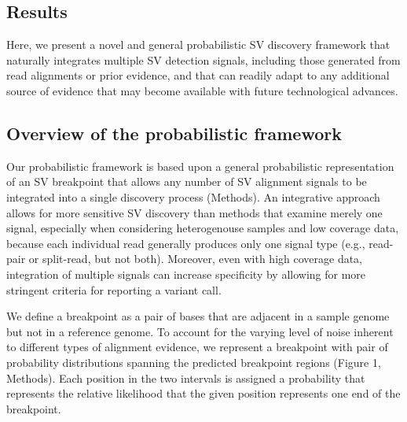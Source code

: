 \documentclass[10pt]{bmc_article}
\newenvironment{bmcformat}{\begin{raggedright}\baselineskip20pt\sloppy\setboolean{publ}{false}}{\end{raggedright}\baselineskip20pt\sloppy}
\begin{document}
\begin{bmcformat}
\section*{Results}
Here, we present a novel and general probabilistic SV discovery framework that
naturally integrates multiple SV detection signals, including those generated
from read alignments or prior evidence, and that can readily adapt to any
additional source of evidence that may become available with future
technological advances.

\subsection*{Overview of the probabilistic framework}

Our probabilistic framework is based upon a general probabilistic representation
of an SV breakpoint that allows any number of SV alignment signals to be
integrated into a single discovery process (Methods). An integrative approach
allows for more sensitive SV discovery than methods that examine merely one
signal, especially when considering heterogenouse samples and low coverage data,
because each individual read generally produces only one signal type (e.g.,
read-pair or split-read, but not both). Moreover, even with high coverage data,
integration of multiple signals can increase specificity by allowing for more
stringent criteria for reporting a variant call.

We define a breakpoint as a pair of bases that are adjacent in a sample genome
but not in a reference genome. To account for the varying level of noise
inherent to different types of alignment evidence, we represent a breakpoint
with pair of probability distributions spanning the predicted breakpoint regions
(Figure 1, Methods). Each position in the two intervals is assigned a
probability that represents the relative likelihood that the given position
represents one end of the breakpoint.


\end{bmcformat}
\end{document}
